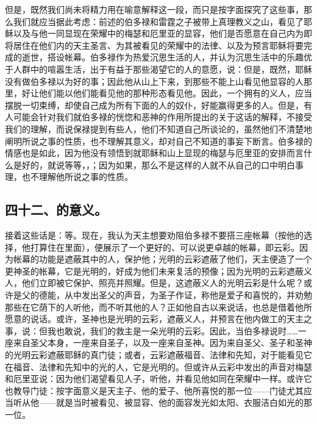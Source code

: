 但是，既然我们尚未将精力用在喻意解释这一段，而只是按字面探究了这些事，那么我们就应当据此考虑：前述的伯多禄和雷霆之子被带上真理教义之山，看见了耶稣以及与他一同显现在荣耀中的梅瑟和厄里亚的显容，他们是否愿意在自己内为即将居住在他们内的天主圣言、为其被看见的荣耀中的法律、以及为预言耶稣将要完成的逝世，搭设帐幕。伯多禄作为热爱沉思生活的人，并认为沉思生活中的乐趣优于人群中的喧嚣生活，出于有益于那些渴望它的人的意愿，说：但是，既然，耶稣没有做伯多禄以为好的事；因此他从山上下来，到那些不能上山看见他显容的人那里，好让他们能以他们能看见他的那种形态看见他。因此，一个拥有的义人，应当摆脱一切束缚，却使自己成为所有下面的人的奴仆，好能赢得更多的人。但是，有人可能会针对我们就伯多禄的恍惚和恶神的作用所提出的关于这话的解释，不接受我们的理解，而说保禄提到有些人，他们不知道自己所谈论的，虽然他们不清楚地阐明所说之事的性质，也不理解其意义，却对自己不知道的事妄下断言。伯多禄的情感也是如此，因为他没有领悟到就耶稣和山上显现的梅瑟与厄里亚的安排而言什么是好的，就说等等，，；因为如果，那么不是这样的人就不从自己的口中明白事理，也不理解他所说之事的性质。\par


\subsection{四十二、的意义。}

接着这些话是：等。现在，我认为天主想要劝阻伯多禄不要搭三座帐幕（按他的选择，他打算住在里面），便展示了一个更好的、可以说更卓越的帐幕，即云彩。因为帐幕的功能是遮蔽其中的人，保护他；光明的云彩遮蔽了他们，天主便造了一个更神圣的帐幕，它是光明的，好成为他们未来复活的预像；因为光明的云彩遮蔽义人，他们立即被它保护、照亮并照耀。但是，这遮蔽义人的光明云彩是什么呢？或许是父的德能，从中发出圣父的声音，为圣子作证，称他是爱子和喜悦的，并劝勉那些在它荫下的人听他，而不听其他的人？正如他自古以来说话，也总是借着他所愿意的说话。或许，圣神也是光明的云彩，遮蔽义人，并预言在他内做工的天主之事，说：但我也敢说，我们的救主是一朵光明的云彩。因此，当伯多禄说时……一座来自圣父本身，一座来自圣子，以及一座来自圣神。因为来自圣父、圣子和圣神的光明云彩遮蔽耶稣的真门徒；或者，云彩遮蔽福音、法律和先知，对于能看见它在福音、法律和先知中的光的人，它是光明的。但或许从云彩中发出的声音对梅瑟和厄里亚说：因为他们渴望看见人子，听他，并看见他如同在荣耀中一样。或许它也教导门徒：按字面意义是天主子、他的爱子、他所喜悦的那一位——门徒尤其应当听从他——就是当时被看见、被显容、他的面容发光如太阳、衣服洁白如光的那一位。\par

